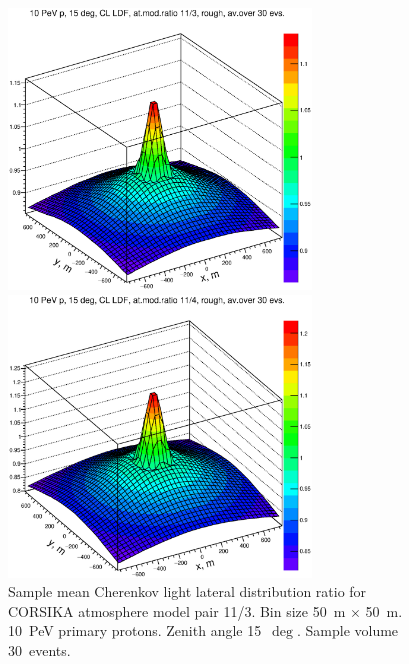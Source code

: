 \documentclass[final,5p,times,twocolumn]{elsarticle}
\begin{document}
\begin{figure}[tb]
 \begin{minipage}[t]{0.48\textwidth}
    \centering
    \includegraphics[width=19pc]{11d3.eps}%
    \vspace{-1.0pc}
    \caption{Sample mean Cherenkov light lateral distribution ratio for CORSIKA atmosphere model
    pair 11/3. Bin size 50~m $\times$ 50~m. 10~PeV primary protons. Zenith angle 15~$\deg$. Sample volume 30~events.}
\label{fig:3d11}
\end{minipage}
\hfill
\begin{minipage}[t]{0.48\textwidth}
    \centering
    \includegraphics[width=19pc]{11d4.eps}%

\end{minipage}
\end{figure}
\end{document}
